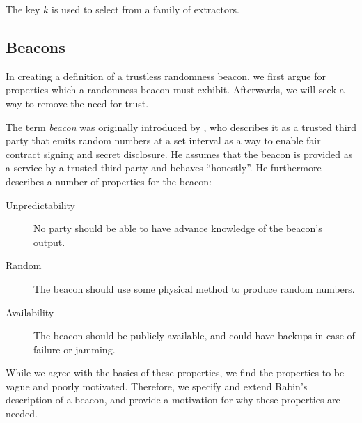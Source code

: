 The key $k$ is used to select from a family of extractors.

\subsection{Beacons}

In creating a definition of a trustless randomness beacon, we first argue for properties which a randomness beacon must exhibit.
Afterwards, we will seek a way to remove the need for trust.

The term \emph{beacon} was originally introduced by \citet{rabin1983transaction}, who describes it as a trusted third party that emits random numbers at a set interval as a way to enable fair contract signing and secret disclosure.
He assumes that the beacon is provided as a service by a trusted third party and behaves \enquote{honestly}.
He furthermore describes a number of properties for the beacon:

\begin{description}
    \item[Unpredictability] No party should be able to have advance knowledge of the beacon's output.
    \item[Random] The beacon should use some physical method to produce random numbers.
    \item[Availability] The beacon should be publicly available, and could have backups in case of failure or jamming.
\end{description}

While we agree with the basics of these properties, we find the properties to be vague and poorly motivated.
Therefore, we specify and extend Rabin's description of a beacon, and provide a motivation for why these properties are needed.

